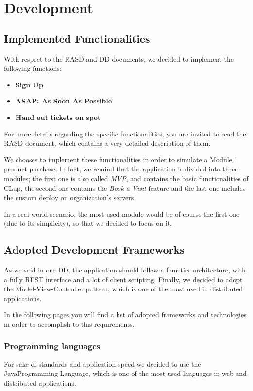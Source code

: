 \documentclass[table, 12pt]{article}
\begin{document}
\newpage
\section{Development}
\subsection{Implemented Functionalities}
With respect to the RASD and DD documents, we decided to implement the following functions:
\begin{itemize}
    \item \textbf{Sign Up}
    \item \textbf{ASAP: As Soon As Possible}
    \item \textbf{Hand out tickets on spot}
\end{itemize}
For more details regarding the specific functionalities, you are invited to read the RASD document, which contains a very detailed description of them.

We chooses to implement these functionalities in order to simulate a Module 1 product purchase. In fact, we remind that the application is divided into three modules; the first one is also called \textit{MVP}, and contains the basic functionalities of CLup, the second one contains the \textit{Book a Visit} feature and the last one includes the custom deploy on organization's servers.

In a real-world scenario, the most used module would be of course the first one (due to its simplicity), so that we decided to focus on it.

\subsection{Adopted Development Frameworks}
As we said in our DD, the application should follow a four-tier architecture, with a fully REST interface and a lot of client scripting. Finally, we decided to adopt the Model-View-Controller pattern, which is one of the most used in distributed applications.

In the following pages you will find a list of adopted frameworks and technologies in order to accomplish to this requirements.

\subsubsection{Programming languages}
For sake of standards and application speed we decided to use the Java\texttrademark  Programming Language, which is one of the most used languages in web and distributed applications.
\end{document}

